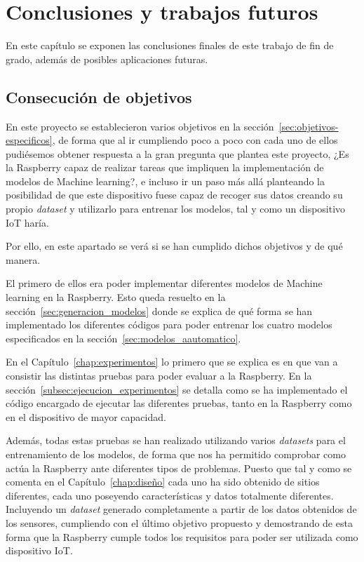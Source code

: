 \documentclass[a4paper, 12pt]{book}
\begin{document}
\cleardoublepage



\chapter{Conclusiones y trabajos futuros}
\label{chap:conclusiones}

En este capítulo se exponen las conclusiones finales de este trabajo de fin de grado, además de posibles aplicaciones futuras.

\section{Consecución de objetivos}
\label{sec:consecucion-objetivos}

En este proyecto se establecieron varios objetivos en la sección~\ref{sec:objetivos-especificos}, de forma que al ir cumpliendo poco a poco con cada uno de ellos pudiésemos obtener respuesta a la gran pregunta que plantea este proyecto, ¿Es la Raspberry capaz de realizar tareas que impliquen la implementación de modelos de Machine learning?, e incluso ir un paso más allá planteando la posibilidad de que este dispositivo fuese capaz de recoger sus datos creando su propio \textit{dataset} y utilizarlo para entrenar los modelos, tal y como un dispositivo IoT haría.

Por ello, en este apartado se verá si se han cumplido dichos objetivos y de qué manera.

El primero de ellos era poder implementar diferentes modelos de Machine learning en la Raspberry. Esto queda resuelto en la sección~\ref{sec:generacion_modelos} donde se explica de qué forma se han implementado los diferentes códigos para poder entrenar los cuatro modelos especificados en la sección~\ref{sec:modelos_aautomatico}.

En el Capítulo~\ref{chap:experimentos} lo primero que se explica es en que van a consistir las distintas pruebas para poder evaluar a la Raspberry. En la sección~\ref{subsec:ejecucion_experimentos} se detalla como se ha implementado el código encargado de ejecutar las diferentes pruebas, tanto en la Raspberry como en el dispositivo de mayor capacidad.

Además, todas estas pruebas se han realizado utilizando varios \textit{datasets} para el entrenamiento de los modelos, de forma que nos ha permitido comprobar como actúa la Raspberry ante diferentes tipos de problemas. Puesto que tal y como se comenta en el Capítulo~\ref{chap:diseño} cada uno ha sido obtenido de sitios diferentes, cada uno poseyendo características y datos totalmente diferentes. Incluyendo un \textit{dataset} generado completamente a partir de los datos obtenidos de los sensores, cumpliendo con el último objetivo propuesto y demostrando de esta forma que la Raspberry cumple todos los requisitos para poder ser utilizada como dispositivo IoT.
\end{document}
